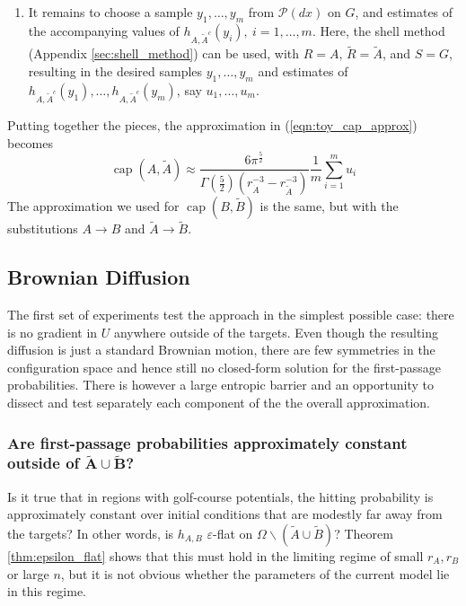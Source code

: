 \documentclass[12pt, nofootinbib,english, amsmath, amssymb, aps, priprint, graphicx,floatfix]{revtex4-1}
\theoremstyle{plain}
\theoremstyle{definition}
\theoremstyle{plain}
\newcommand{\capac}[2]{\ensuremath{\operatorname{cap}}(#1,#2)}
\newcommand{\PMeasure}{\mathscr{P}(dx)}
\newcommand{\dA}{{\dot A}}
\newcommand{\tA}{{\tilde A}}
\newcommand{\tB}{{\tilde B}}
\begin{document}
\begin{enumerate}
\item  It remains to choose a sample $y_1,\ldots,y_m$ from $\PMeasure$ on $G$, and estimates of the accompanying values of $h_{A,\tA^c}(y_i),\ i=1,\ldots,m$. Here, the shell method (Appendix \ref{sec:shell_method}) can be used, with $R=A$, $\tilde{R}=\tA$, and $S=G$, resulting in the desired samples $y_1,\ldots,y_m$ and estimates of $h_{A,\tA^c}(y_1),
\ldots,h_{A,\tA^c}(y_m)$,  say $u_1,\ldots,u_m$.

\end{enumerate}

Putting together the pieces, the approximation in (\ref{eqn:toy_cap_approx}) becomes
\begin{equation}
\label{eqn:approx_capacities}
\capac{A}{\tilde A} \approx
\frac{6\pi^{\frac{5}{2}}}
{\Gamma(\frac{5}{2})(r_\dA^{-3} - r_\tA^{-3})} 
\frac{1}{m}\sum_{i=1}^m u_i
\end{equation}
The approximation we used for $\capac{B}{\tB}$ is the same, but with the substitutions $A\to B$ and $\tA\to\tB$.

\subsection{Brownian Diffusion}
\label{sec:B_D}

The first set of experiments test the approach in the simplest possible case: there is no gradient in $U$ anywhere outside of the targets. Even though the resulting diffusion is just a standard Brownian motion, there are few symmetries in the configuration space and hence still no closed-form solution for the first-passage probabilities. There is however a large entropic barrier and an opportunity to dissect and test separately each component of the the overall approximation. 

\subsubsection{Are first-passage probabilities approximately constant outside of $\bm{\tA\cup\tB}$?}
\label{sec:toy_constant}
Is it true that in regions with golf-course potentials, the hitting probability is approximately constant over initial conditions that are modestly far away from the targets? In other words, is $h_{A,B}$  $\varepsilon$-flat on $\Omega\backslash(\tA\cup\tB)$?  Theorem \ref{thm:epsilon_flat} shows that this must hold in the limiting regime of small $r_A,r_B$ or large $n$, but it is not obvious whether the parameters of the current model lie in this regime.  
\end{document}
